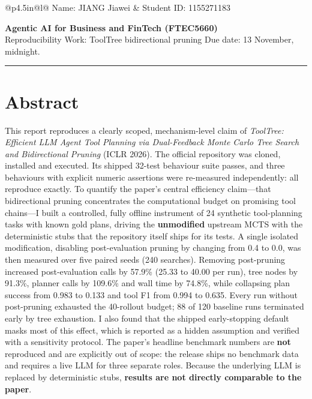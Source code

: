 \documentclass[11pt,letterpaper]{article}
\newcommand{\code}[1]{\texttt{\detokenize{#1}}}
\begin{document}
\noindent
\begin{tabular}{@{}p{4.5in}@{}l@{}}
Name: JIANG Jiawei & Student ID: 1155271183
\end{tabular}

\begin{center}
\textbf{Agentic AI for Business and FinTech (FTEC5660)}\\[3pt]
Reproducibility Work: ToolTree bidirectional pruning \quad Due date: 13 November, midnight.\\
\vspace{2pt}
\rule{\linewidth}{0.4pt}
\end{center}

\vspace{2pt}

\section*{Abstract}

This report reproduces a clearly scoped, mechanism-level claim of \emph{ToolTree:
Efficient LLM Agent Tool Planning via Dual-Feedback Monte Carlo Tree Search and
Bidirectional Pruning} (ICLR 2026). The official repository was cloned, installed
and executed. Its shipped 32-test behaviour suite passes, and three behaviours with
explicit numeric assertions were re-measured independently: all reproduce exactly.
To quantify the paper's central efficiency claim---that bidirectional pruning
concentrates the computational budget on promising tool chains---I built a
controlled, fully offline instrument of 24 synthetic tool-planning tasks with known
gold plans, driving the \textbf{unmodified} upstream MCTS with the deterministic
stubs that the repository itself ships for its tests. A single isolated
modification, disabling post-evaluation pruning by changing \code{tau_post} from
0.4 to 0.0, was then measured over five paired seeds (240 searches). Removing
post-pruning increased post-evaluation calls by 57.9\% (25.33 to 40.00 per run),
tree nodes by 91.3\%, planner calls by 109.6\% and wall time by 74.8\%, while
collapsing plan success from 0.983 to 0.133 and tool F1 from 0.994 to 0.635.
Every run without post-pruning exhausted the 40-rollout budget; 88 of 120 baseline
runs terminated early by tree exhaustion. I also found that the shipped
early-stopping default masks most of this effect, which is reported as a hidden
assumption and verified with a sensitivity protocol. The paper's headline
benchmark numbers are \textbf{not} reproduced and are explicitly out of scope:
the release ships no benchmark data and requires a live LLM for three separate
roles. Because the underlying LLM is replaced by deterministic stubs,
\textbf{results are not directly comparable to the paper}.
\end{document}

